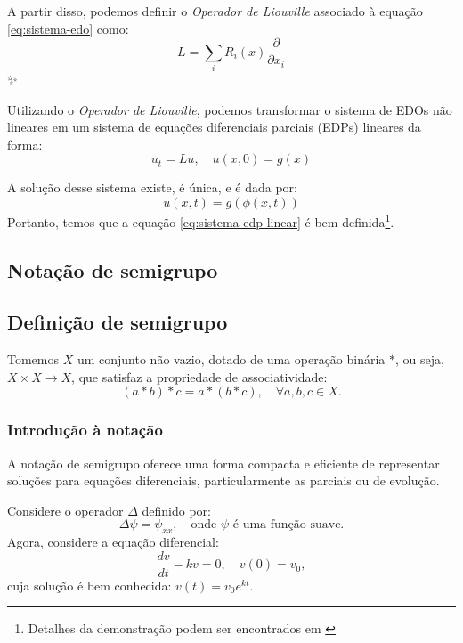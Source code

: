 \documentclass[12pt]{article}
\begin{document}
A partir disso, podemos definir o \textit{Operador de Liouville} associado à equação \eqref{eq:sistema-edo} como:
\begin{equation}
	L = \sum_i R_i(x) \frac{\partial}{\partial x_i}
	\label{eq:liouville-operator}
\end{equation}✨

Utilizando o \textit{Operador de Liouville}, podemos transformar o sistema de EDOs não lineares em um sistema de equações diferenciais parciais (EDPs) lineares da forma:
\begin{equation}
	u_t = Lu, \quad u(x,0) = g(x)
	\label{eq:sistema-edp-linear}
\end{equation}

A solução desse sistema existe, é única, e é dada por:
\begin{equation}
	u(x,t) = g(\phi(x,t))   
	\label{eq:solucao-sistema-edp-linear}
\end{equation}
Portanto, temos que a equação \eqref{eq:sistema-edp-linear} é bem definida\footnote{Detalhes da demonstração podem ser encontrados em \citet[p.~181-182]{Chorin2013}}.

\subsection{Notação de semigrupo}
\subsection{Definição de semigrupo}
Tomemos $X$ um conjunto não vazio, dotado de uma operação binária $ * $, ou seja, $ X \times X \to X $, que satisfaz a propriedade de associatividade:
\begin{equation*}
	(a * b) * c = a * (b * c), \quad \forall a,b,c \in X.
\end{equation*}

\subsubsection{Introdução à notação}
A notação de semigrupo oferece uma forma compacta e eficiente de representar soluções para equações diferenciais, particularmente as parciais ou de evolução.

Considere o operador $\Delta$ definido por:
\begin{equation*}
	\Delta \psi = \psi_{xx}, \quad \text{onde $\psi$ é uma função suave}.
\end{equation*}
Agora, considere a equação diferencial:
\begin{equation*}
	\frac{dv}{dt} - kv = 0, \quad v(0) = v_0,
\end{equation*}
cuja solução é bem conhecida: $ v(t) = v_0 e^{kt} $.
\end{document}
